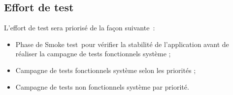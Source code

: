 \subsection{Effort de test}
\label{sec:peri:effort}

L’effort de test sera priorisé de la façon suivante~:
\begin{itemize}
    \item Phase de \og Smoke test \fg pour vérifier la stabilité de l’application avant de réaliser la campagne de tests fonctionnels système ;
    \item Campagne de tests fonctionnels système selon les priorités ;
    \item Campagne de tests non fonctionnels système par priorité.
\end{itemize}
